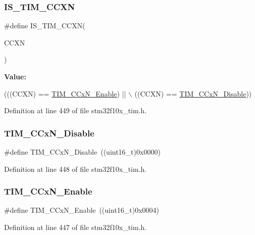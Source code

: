 \subsubsection{\texorpdfstring{I\+S\+\_\+\+T\+I\+M\+\_\+\+C\+C\+XN}{IS\_TIM\_CCXN}}
{\footnotesize\ttfamily \#define I\+S\+\_\+\+T\+I\+M\+\_\+\+C\+C\+XN(\begin{DoxyParamCaption}\item[{}]{C\+C\+XN }\end{DoxyParamCaption})}

{\bfseries Value\+:}
\begin{DoxyCode}
(((CCXN) == \hyperlink{group___t_i_m___capture___compare___n__state_gab534ddf23d317eb912564292c1cede2d}{TIM\_CCxN\_Enable}) || \(\backslash\)
                           ((CCXN) == \hyperlink{group___t_i_m___capture___compare___n__state_ga0d7d46aeba33ed197aa39775bc527d7d}{TIM\_CCxN\_Disable}))
\end{DoxyCode}


Definition at line 449 of file stm32f10x\+\_\+tim.\+h.

\mbox{\label{group___t_i_m___capture___compare___n__state_ga0d7d46aeba33ed197aa39775bc527d7d}} 
\subsubsection{\texorpdfstring{T\+I\+M\+\_\+\+C\+Cx\+N\+\_\+\+Disable}{TIM\_CCxN\_Disable}}
{\footnotesize\ttfamily \#define T\+I\+M\+\_\+\+C\+Cx\+N\+\_\+\+Disable~((uint16\+\_\+t)0x0000)}



Definition at line 448 of file stm32f10x\+\_\+tim.\+h.

\mbox{\label{group___t_i_m___capture___compare___n__state_gab534ddf23d317eb912564292c1cede2d}} 
\subsubsection{\texorpdfstring{T\+I\+M\+\_\+\+C\+Cx\+N\+\_\+\+Enable}{TIM\_CCxN\_Enable}}
{\footnotesize\ttfamily \#define T\+I\+M\+\_\+\+C\+Cx\+N\+\_\+\+Enable~((uint16\+\_\+t)0x0004)}



Definition at line 447 of file stm32f10x\+\_\+tim.\+h.

